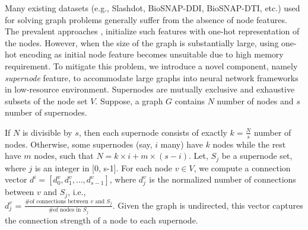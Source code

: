 Many existing datasets (e.g., Slashdot, BioSNAP-DDI, BioSNAP-DTI, etc.) used for solving graph problems generally suffer from the absence of node features. The prevalent approaches \cite{wang2020edge2vec,kishan2021predicting}, initialize such features with one-hot representation of the nodes. However, when the size of the graph is substantially large, using one-hot encoding as initial node feature becomes unsuitable due to high memory requirement. To mitigate this problem, we introduce a novel component, namely \textit{supernode} feature, to accommodate large graphs into neural network frameworks in low-resource environment. Supernodes are mutually exclusive and exhaustive subsets of the node set $V$. Suppose, a graph $G$ contains $N$ number of nodes and $s$ number of supernodes.
\begin{comment}
\begin{equation}
\begin{split}
supernode_0 &= \{ node_0, node_1, \dots, node_{k-1}\}\\
\vdots&\\
supernode_i &= \{node_{ik}, node_{ik+1}, \dots, node_{ik+m-1}\}\\
\vdots&\\
supernode_{S-1} &= \{node_{N-m}, node_{N-m+1}, \dots, node_{N-1}\}
  \end{split}
\label{eqn:supnode}
\end{equation}
\end{comment}
If $N$ is divisible by $s$, then each supernode consists of exactly $k=\frac{N}{s}$ number of nodes. Otherwise, some supernodes (say, $i$ many) have $k$ nodes while the rest have $m$ nodes, such that $N=k\times i+m\times (s-i)$. Let, $S_j$ be a supernode set, where $j$ is an integer in [0, s-1]. For each node $v \in V$, we compute a connection vector $d^i=[d^v_0,d^v_1,…,d^v_{s-1}]$, where $d^v_j$ is the normalized number of connections between $v$ and $S_j$, i.e.,\\ $d^v_j$ = $\frac{\text{\# of connections between $v$ and $S_j$}}{ \text{\# of nodes in $S_j$}}$. Given the graph is undirected, this vector captures the connection strength of a node to each supernode. 

\begin{comment}
If the graph is directed, we concatenate two vectors - the incoming connection vector {$\overleftarrow{ v^i}$} and the outgoing connection vector $\overrightarrow{ v^i}$, i.e., $v^i=[\overleftarrow {v^i},\overrightarrow{v^i}]$. 
\end{comment}

